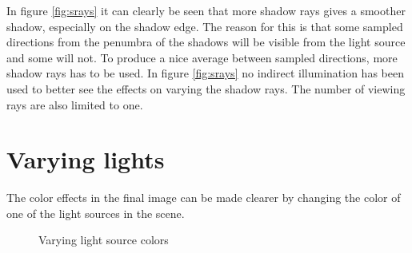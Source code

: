 \documentclass[a4paper]{report}
\begin{document}
In figure \ref{fig:srays} it can clearly be seen that more shadow rays gives
a smoother shadow, especially on the shadow edge. The reason for this
is that some sampled directions from the penumbra of the shadows will
be visible from the light source and some will not. To produce a nice
average between sampled directions, more shadow rays has to be
used. In figure \ref{fig:srays} no indirect illumination has been used
to better see the effects on varying the shadow rays. The number of
viewing rays are also limited to one.

\pagebreak

\section{Varying lights}

The color effects in the final image can be made clearer by changing
the color of one of the light sources in the scene.

\begin{figure}[h]
  \centering
  \caption{Varying light source colors}
  \label{fig:lightcolor}
\end{figure}
\end{document}
